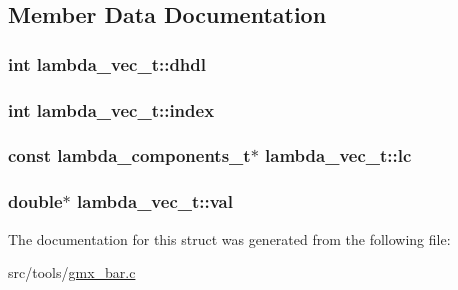 \subsection{\-Member \-Data \-Documentation}
\hypertarget{structlambda__vec__t_a835a9658dd280075e0809d7caaeaca73}{
\subsubsection[{dhdl}]{\setlength{\rightskip}{0pt plus 5cm}int {\bf lambda\-\_\-vec\-\_\-t\-::dhdl}}}\label{structlambda__vec__t_a835a9658dd280075e0809d7caaeaca73}
\hypertarget{structlambda__vec__t_a2a76f867aaac9458a164e97a151fed31}{
\subsubsection[{index}]{\setlength{\rightskip}{0pt plus 5cm}int {\bf lambda\-\_\-vec\-\_\-t\-::index}}}\label{structlambda__vec__t_a2a76f867aaac9458a164e97a151fed31}
\hypertarget{structlambda__vec__t_aed2eb8663ec3691d5394920e4a5add44}{
\subsubsection[{lc}]{\setlength{\rightskip}{0pt plus 5cm}const {\bf lambda\-\_\-components\-\_\-t}$\ast$ {\bf lambda\-\_\-vec\-\_\-t\-::lc}}}\label{structlambda__vec__t_aed2eb8663ec3691d5394920e4a5add44}
\hypertarget{structlambda__vec__t_a614480105677697b5e6a2b95f0e221a3}{
\subsubsection[{val}]{\setlength{\rightskip}{0pt plus 5cm}double$\ast$ {\bf lambda\-\_\-vec\-\_\-t\-::val}}}\label{structlambda__vec__t_a614480105677697b5e6a2b95f0e221a3}


\-The documentation for this struct was generated from the following file\-:\begin{DoxyCompactItemize}
\item 
src/tools/\hyperlink{gmx__bar_8c}{gmx\-\_\-bar.\-c}\end{DoxyCompactItemize}
